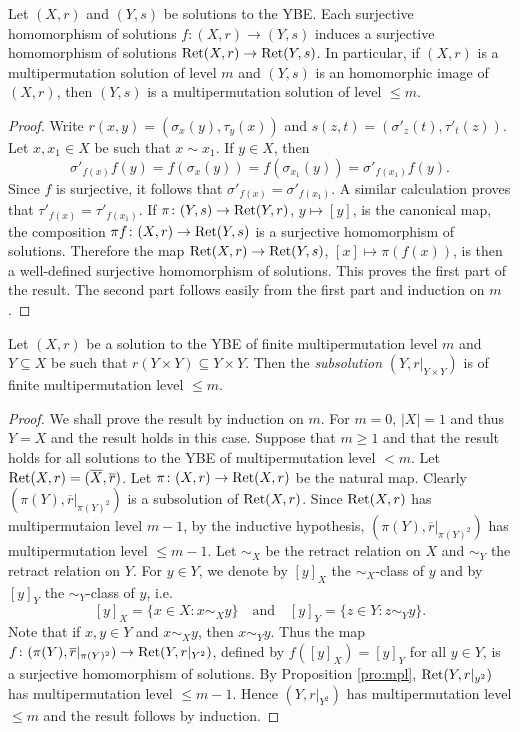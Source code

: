 \begin{proposition}
\label{pro:mpl}
Let $(X,r)$ and $(Y,s)$ be solutions to the YBE. Each surjective homomorphism 
of solutions $f\colon (X,r)\to (Y,s)$ 
induces a surjective homomorphism 
of solutions $\operatorname{Ret}(X,r)\to\operatorname{Ret}(Y,s)$. In particular, if $(X,r)$ is a multipermutation solution of level $m$ and $(Y,s)$ is an homomorphic image of $(X,r)$, then $(Y,s)$ is a multipermutation solution of level $\leq m$. 
\end{proposition}

\begin{proof}
Write $r(x,y)=(\sigma_x(y),\tau_y(x))$ and $s(z,t)=(\sigma'_z(t),\tau'_t(z))$. 
Let $x,x_1\in X$ be such that $x\sim x_1$. If $y\in X$, then 
\[
\sigma'_{f(x)}f(y)=f(\sigma_x(y))=f(\sigma_{x_1}(y))=\sigma'_{f(x_1)}f(y).
\]
Since $f$ is surjective, it follows that $\sigma'_{f(x)}=\sigma'_{f(x_1)}$. A similar calculation proves 
that $\tau'_{f(x)}=\tau'_{f(x_1)}$. If $\pi\colon (Y,s)\to\operatorname{Ret}(Y,r)$, $y\mapsto [y]$, is the canonical map, 
the composition $\pi f\colon (X,r)\to\operatorname{Ret}(Y,s)$ is a surjective homomorphism of solutions. Therefore 
the map $\operatorname{Ret}(X,r)\to\operatorname{Ret}(Y,s)$, $[x]\mapsto\pi(f(x))$, is then a well-defined surjective
homomorphism of solutions. This proves the first part of the result. The second part follows easily from the first part and induction on $m$.
\end{proof}

\begin{proposition}
\label{pro:mpl_subsol}
Let $(X,r)$ be a solution to the YBE of finite multipermutation level $m$ 
and $Y\subseteq X$ be such that $r(Y\times Y)\subseteq Y\times Y$. 
Then the \emph{subsolution} $(Y,r|_{Y\times Y})$ is of finite multipermutation level $\leq m$.  
\end{proposition}

\begin{proof}
We shall prove the result by induction on $m$. For $m=0$, $|X|=1$ and thus $Y=X$ and the result holds in this case. 
Suppose that $m\geq 1$ and that the result holds for all solutions to the YBE of multipermutation level $<m$.
Let $\operatorname{Ret}(X,r)=(\overline{X},\overline{r})$. Let $\pi\colon (X,r)\to\operatorname{Ret}(X,r)$ be the natural map. Clearly $(\pi(Y), \overline{r}|_{\pi(Y)^{2}})$ is a subsolution of $\operatorname{Ret}(X,r)$. Since $\operatorname{Ret}(X,r)$ has multipermutaion level $m-1$, 
by the inductive hypothesis, $(\pi(Y), \overline{r}|_{\pi(Y)^{2}})$ has multipermutation level $\leq m-1$.  Let $\sim_X$ be the retract relation on $X$ and $\sim_Y$ the retract relation on $Y$. For $y\in Y$, we denote by $[y]_X$ the $\sim_X$-class of $y$ and by $[y]_Y$ the $\sim_Y$-class of $y$, i.e.
\[ [y]_X=\{ x\in X : x\sim_X y\}\quad \text{and}\quad [y]_Y=\{ z\in Y :z\sim_Y y\}.\]
Note that if $x,y\in Y$ and $x\sim_X y$, then $x\sim_Y y$. Thus the map $f\colon (\pi(Y),\overline{r}|_{\pi(Y)^2})\to\operatorname{Ret}(Y,r|_{Y^2})$, defined by $f([y]_X)=[y]_Y$ for all $y\in Y$, is a surjective homomorphism of solutions. By Proposition \ref{pro:mpl}, $\operatorname{Ret}(Y,r|_{y^2})$ has multipermutation level $\leq m-1$. Hence $(Y,r|_{Y^2})$ has multipermutation level $\leq m$ and the result follows by induction. 
\end{proof}

